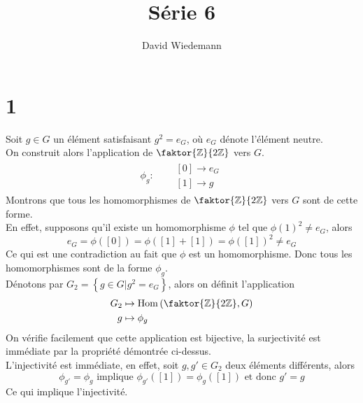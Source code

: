 \documentclass[11pt, a4paper, twoside]{article}
\DeclareMathOperator*{\Hom}{Hom}
\begin{document}
\title{Série 6}
\author{David Wiedemann}
\maketitle
\section*{1}
Soit $g \in G$ un élément satisfaisant $g^{2}= e_G$, où $e_G$ dénote l'élément neutre.\\
On construit alors l'application de $\faktor { \mathbb{Z}} { 2\mathbb{Z}}$ vers $G$.\\
\begin{align*}
	\phi_g: & 
	\begin{array}{ll}
	\quad [ 0 ] \to e_G\\
	\quad [ 1 ] \to g
	\end{array}
\end{align*}
Montrons que tous les homomorphismes de $\faktor { \mathbb{Z}} { 2\mathbb{Z}}$ vers $G$ sont de cette forme.\\
En effet, supposons qu'il existe un homomorphisme $\phi$ tel que $\phi( 1) ^{2}\neq e_G$, alors 
\[ 
	e_G = \phi( [ 0] ) =	\phi( [ 1 ]+[ 1 ])  = \phi( [ 1] ) ^{2} \neq e_G
\]
Ce qui est une contradiction au fait que $\phi$ est un homomorphisme. Donc tous les homomorphismes sont de la forme $\phi_g$.\\
Dénotons par $G_2= \left\{ g \in G | g^{2} = e_G \right\} $, alors on définit l'application
\begin{align*}
	G_2 &\mapsto \Hom\left( \faktor { \mathbb{Z}} { 2\mathbb{Z}},G\right)  \\
	g &\mapsto \phi_g\\
\end{align*}
On vérifie facilement que cette application est bijective, la surjectivité est immédiate par la propriété démontrée ci-dessus.\\
L'injectivité est immédiate, en effet, soit $g,g' \in G_2$ deux éléments différents, alors
\[ 
	\phi_{g'}  = \phi_{g} \text{ implique } \phi _{g'} ( [ 1] ) = \phi_{g} ( [ 1] ) \text{ et donc  } g' = g
\]
Ce qui implique l'injectivité.
\end{document}
